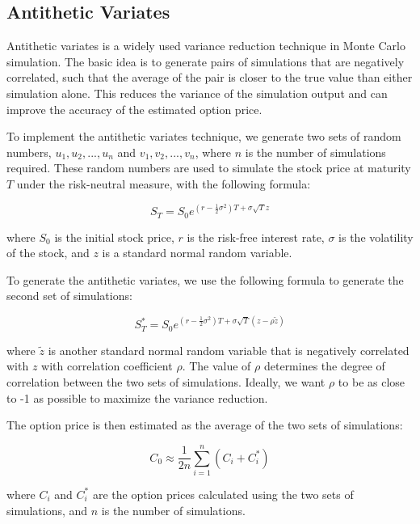 \documentclass[11pt, a4paper, leqno]{article}
\begin{document}
\subsection{Antithetic Variates}

Antithetic variates is a widely used variance reduction technique in Monte Carlo simulation. The basic idea is to generate pairs of simulations that are negatively correlated, such that the average of the pair is closer to the true value than either simulation alone. This reduces the variance of the simulation output and can improve the accuracy of the estimated option price.

To implement the antithetic variates technique, we generate two sets of random numbers, ${u_1, u_2, ..., u_n}$ and ${v_1, v_2, ..., v_n}$, where $n$ is the number of simulations required. These random numbers are used to simulate the stock price at maturity $T$ under the risk-neutral measure, with the following formula:

\begin{equation}
S_T = S_0 e^{(r - \frac{1}{2}\sigma^2)T + \sigma\sqrt{T}z}
\end{equation}

where $S_0$ is the initial stock price, $r$ is the risk-free interest rate, $\sigma$ is the volatility of the stock, and $z$ is a standard normal random variable.

To generate the antithetic variates, we use the following formula to generate the second set of simulations:

\begin{equation}
S_T^{*} = S_0 e^{(r - \frac{1}{2}\sigma^2)T + \sigma\sqrt{T}(z - \rho \tilde{z})}
\end{equation}

where $\tilde{z}$ is another standard normal random variable that is negatively correlated with $z$ with correlation coefficient $\rho$. The value of $\rho$ determines the degree of correlation between the two sets of simulations. Ideally, we want $\rho$ to be as close to -1 as possible to maximize the variance reduction.

The option price is then estimated as the average of the two sets of simulations:

\begin{equation}
C_0 \approx \frac{1}{2n} \sum_{i=1}^{n} (C_i + C_i^*)
\end{equation}

where $C_i$ and $C_i^*$ are the option prices calculated using the two sets of simulations, and $n$ is the number of simulations.
\end{document}
